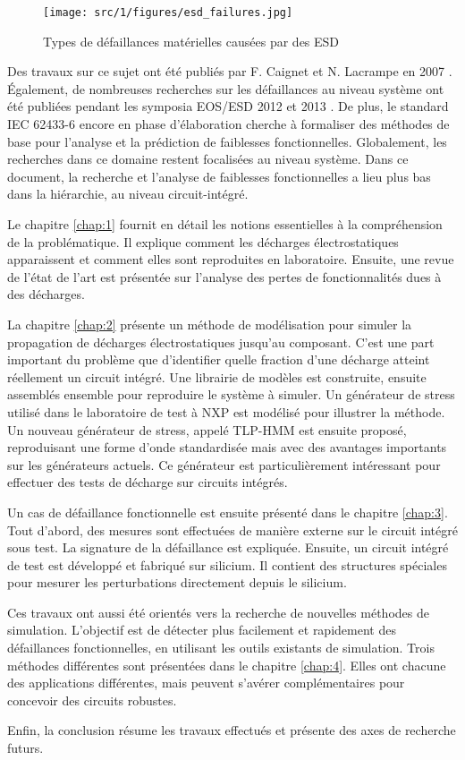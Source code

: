 \begin{figure}[!h]
  \centering
  \texttt{[image: src/1/figures/esd\_failures.jpg]}
  \caption{Types de défaillances matérielles causées par des ESD}
  \label{fig:esd-failures}
\end{figure}

Des travaux sur ce sujet ont été publiés par F. Caignet et N. Lacrampe en 2007 \cite{}.
Également, de nombreuses recherches sur les défaillances au niveau système ont été publiées pendant les symposia EOS/ESD 2012 \cite{} et 2013 \cite{}.
De plus, le standard IEC 62433-6 encore en phase d'élaboration cherche à formaliser des méthodes de base pour l'analyse et la prédiction de faiblesses fonctionnelles.
Globalement, les recherches dans ce domaine restent focalisées au niveau système.
Dans ce document, la recherche et l'analyse de faiblesses fonctionnelles a lieu plus bas dans la hiérarchie, au niveau circuit-intégré.

%
Le chapitre \ref{chap:1} fournit en détail les notions essentielles à la compréhension de la problématique.
Il explique comment les décharges électrostatiques apparaissent et comment elles sont reproduites en laboratoire.
Ensuite, une revue de l'état de l'art est présentée sur l'analyse des pertes de fonctionnalités dues à des décharges.

%
La chapitre \ref{chap:2} présente un méthode de modélisation pour simuler la propagation de décharges électrostatiques jusqu'au composant.
C'est une part important du problème que d'identifier quelle fraction d'une décharge atteint réellement un circuit intégré.
Une librairie de modèles est construite, ensuite assemblés ensemble pour reproduire le système à simuler.
Un générateur de stress utilisé dans le laboratoire de test à NXP est modélisé pour illustrer la méthode.
Un nouveau générateur de stress, appelé TLP-HMM est ensuite proposé, reproduisant une forme d'onde standardisée mais avec des avantages importants sur les générateurs actuels.
Ce générateur est particulièrement intéressant pour effectuer des tests de décharge sur circuits intégrés.

%
Un cas de défaillance fonctionnelle est ensuite présenté dans le chapitre \ref{chap:3}.
Tout d'abord, des mesures sont effectuées de manière externe sur le circuit intégré sous test.
La signature de la défaillance est expliquée.
Ensuite, un circuit intégré de test est développé et fabriqué sur silicium.
Il contient des structures spéciales pour mesurer les perturbations directement depuis le silicium.

%
Ces travaux ont aussi été orientés vers la recherche de nouvelles méthodes de simulation.
L'objectif est de détecter plus facilement et rapidement des défaillances fonctionnelles, en utilisant les outils existants de simulation.
Trois méthodes différentes sont présentées dans le chapitre \ref{chap:4}.
Elles ont chacune des applications différentes, mais peuvent s'avérer complémentaires pour concevoir des circuits robustes.

%
Enfin, la conclusion résume les travaux effectués et présente des axes de recherche futurs.
